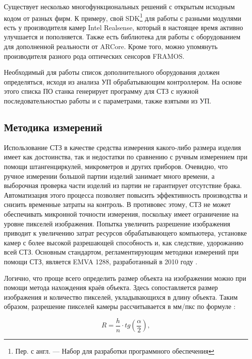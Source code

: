 Существует несколько многофункциональных решений с открытым исходным кодом от разных фирм. К примеру, свой SDK\footnote{Пер. с англ. --- Набор для разработки программного обеспечения} для работы с разными модулями есть у производителя камер Intel Realsense, который в настоящее время активно улучшается и пополняется. Также есть библиотека для работы с оборудованием для дополненной реальности от ARCore. Кроме того, можно упомянуть производителя разного рода оптических сенсоров FRAMOS.

Необходимый для работы список дополнительного оборудования должен определяться, исходя из анализа УП обрабатывающим контроллером. На основе этого списка ПО станка генерирует программу для СТЗ с нужной последовательностью работы и с параметрами, также взятыми из УП.

\subsection{Методика измерений} \label{ssect3_3_5}

Использование СТЗ в качестве средства измерения какого-либо размера изделия имеет как достоинства, так и недостатки по сравнению с ручным измерением при помощи штангенциркулей, микрометров и других приборов. Очевидно, что ручное измерении большой партии изделий занимает много времени, а выборочная проверка части изделий из партии не гарантирует отсутствие брака. Автоматизация этого процесса позволяет повысить эффективность производства и снизить временные затраты на контроль. В противовес этому, СТЗ не может обеспечивать микронной точности измерения, поскольку имеет ограничение на уровне пикселей изображения. Попытка увеличить разрешение изображения приводит к увеличению затрат ресурсов обрабатывающего компьютера, установке камер с более высокой разрешающей способность и, как следствие, удорожанию всей СТЗ. Основным стандартом, регламентирующим методики измерений при помощи СТЗ, является EMVA 1288, разработанный в 2010 году \cite{emva1288}.

Логично, что проще всего определить размер объекта на изображении можно при помощи метода нахождения краёв объекта. Здесь сопоставляется размер изображения и количество пикселей, укладывающихся в длину объекта. Таким образом, разрешение пикселей камеры рассчитывается в мм/пкс по формуле \cite{eq_3_25}:

\begin{equation}
R = \frac{h}{n} \cdot tg(\frac{\alpha}{2}),
\label{eq_3_25}
\end{equation}

